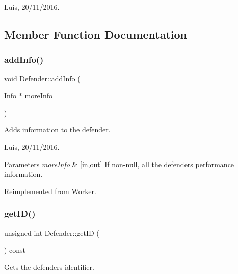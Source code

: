 Luís, 20/11/2016. 

\subsection{Member Function Documentation}
\hypertarget{class_defender_abcd887808491719d6e40d92d68862b4e}{}\label{class_defender_abcd887808491719d6e40d92d68862b4e} 
\subsubsection{\texorpdfstring{add\+Info()}{addInfo()}}
{\footnotesize\ttfamily void Defender\+::add\+Info (\begin{DoxyParamCaption}\item[{\hyperlink{class_info}{Info} $\ast$}]{more\+Info }\end{DoxyParamCaption})\hspace{0.3cm}{\ttfamily [virtual]}}



Adds information to the defender. 

Luís, 20/11/2016. 


\begin{DoxyParams}{Parameters}
{\em more\+Info} & \mbox{[}in,out\mbox{]} If non-\/null, all the defender\textquotesingle{}s performance information. \\
\hline
\end{DoxyParams}


Reimplemented from \hyperlink{class_worker_ad54db262f7473cc729c371dd54e292eb}{Worker}.

\hypertarget{class_defender_ad2aadb1cb382bf08522bd858ecc69667}{}\label{class_defender_ad2aadb1cb382bf08522bd858ecc69667} 
\subsubsection{\texorpdfstring{get\+I\+D()}{getID()}}
{\footnotesize\ttfamily unsigned int Defender\+::get\+ID (\begin{DoxyParamCaption}{ }\end{DoxyParamCaption}) const\hspace{0.3cm}{\ttfamily [virtual]}}



Gets the defender\textquotesingle{}s identifier. 

